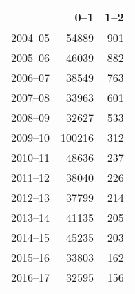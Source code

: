 \begin{table}[ht]
\centering
\begin{tabular}{rrr}
  \hline
 & 0--1 & 1--2 \\ 
  \hline
2004--05 & 54889 & 901 \\ 
  2005--06 & 46039 & 882 \\ 
  2006--07 & 38549 & 763 \\ 
  2007--08 & 33963 & 601 \\ 
  2008--09 & 32627 & 533 \\ 
  2009--10 & 100216 & 312 \\ 
  2010--11 & 48636 & 237 \\ 
  2011--12 & 38040 & 226 \\ 
  2012--13 & 37799 & 214 \\ 
  2013--14 & 41135 & 205 \\ 
  2014--15 & 45235 & 203 \\ 
  2015--16 & 33803 & 162 \\ 
  2016--17 & 32595 & 156 \\ 
   \hline
\end{tabular}
\end{table}
